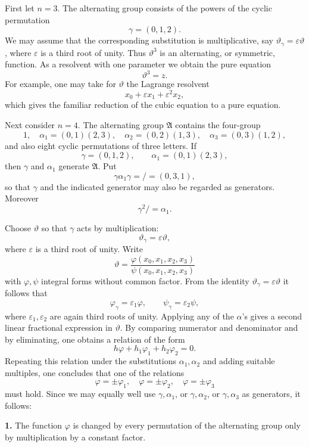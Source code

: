 \documentclass[12pt,a4paper]{article}
\newcommand{\A}{\mathfrak A}
\begin{document}
First let $n=3$.  The alternating group consists of the powers of the cyclic permutation
\[
 \gamma=(0,1,2).
\]
We may assume that the corresponding substitution is multiplicative, say $\vartheta_\gamma=\varepsilon\vartheta$, where $\varepsilon$ is a third root of unity.  Thus $\vartheta^3$ is an alternating, or symmetric, function.  As a resolvent with one parameter we obtain the pure equation
\[
 \vartheta^3=z.
\]
For example, one may take for $\vartheta$ the Lagrange resolvent
\[
 x_0+\varepsilon x_1+\varepsilon^2x_2,
\]
which gives the familiar reduction of the cubic equation to a pure equation.

Next consider $n=4$.  The alternating group $\A$ contains the four-group
\[
 1,
 \quad\alpha_1=(0,1)(2,3),
 \quad\alpha_2=(0,2)(1,3),
 \quad\alpha_3=(0,3)(1,2),
\]
and also eight cyclic permutations of three letters.  If
\[
 \gamma=(0,1,2),\qquad \alpha_1=(0,1)(2,3),
\]
then $\gamma$ and $\alpha_1$ generate $\A$.  Put
\[
 \gamma\alpha_1\gamma=/\!=(0,3,1),
\]
so that $\gamma$ and the indicated generator may also be regarded as generators.  Moreover
\begin{equation}
 \gamma^2/=\alpha_1.
\end{equation}

Choose $\vartheta$ so that $\gamma$ acts by multiplication:
\[
 \vartheta_\gamma=\varepsilon\vartheta,
\]
where $\varepsilon$ is a third root of unity.  Write
\begin{equation}
 \vartheta=\frac{\varphi(x_0,x_1,x_2,x_3)}{\psi(x_0,x_1,x_2,x_3)}
\end{equation}
with $\varphi,\psi$ integral forms without common factor.  From the identity $\vartheta_\gamma=\varepsilon\vartheta$ it follows that
\[
 \varphi_\gamma=\varepsilon_1\varphi,
 \qquad
 \psi_\gamma=\varepsilon_2\psi,
\]
where $\varepsilon_1,\varepsilon_2$ are again third roots of unity.  Applying any of the $\alpha$'s gives a second linear fractional expression in $\vartheta$.  By comparing numerator and denominator and by eliminating, one obtains a relation of the form
\[
 h\varphi+h_1\varphi_1+h_2\varphi_2=0.
\]
Repeating this relation under the substitutions $\alpha_1,
\alpha_2$ and adding suitable multiples, one concludes that one of the relations
\[
 \varphi=\pm\varphi_1,
 \quad
 \varphi=\pm\varphi_2,
 \quad
 \varphi=\pm\varphi_3
\]
must hold.  Since we may equally well use $\gamma,
\alpha_1$, or $\gamma,
\alpha_2$, or $\gamma,
\alpha_3$ as generators, it follows:

\textbf{1.} The function $\varphi$ is changed by every permutation of the alternating group only by multiplication by a constant factor.
\end{document}
